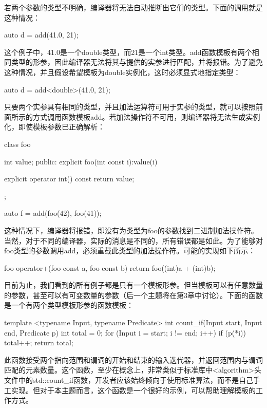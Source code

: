若两个参数的类型不明确，编译器将无法自动推断出它们的类型。下面的调用就是这种情况：

\begin{cpp}
auto d = add(41.0, 21);
\end{cpp}

这个例子中，41.0是一个double类型，而21是一个int类型。add函数模板有两个相同类型的形参，因此编译器无法将其与提供的实参进行匹配，并将报错。为了避免这种情况，并且假设希望模板为double实例化，这时必须显式地指定类型：

\begin{cpp}
auto d = add<double>(41.0, 21);
\end{cpp}

只要两个实参具有相同的类型，并且加法运算符可用于实参的类型，就可以按照前面所示的方式调用函数模板add。若加法操作符不可用，则编译器将无法生成实例化，即使模板参数已正确解析：

\begin{cpp}
class foo
{
	int value;
public:
	explicit foo(int const i):value(i)
	{ }
	
	explicit operator int() const { return value; }
};

auto f = add(foo(42), foo(41));
\end{cpp}

这种情况下，编译器将报错，即没有为类型为foo的参数找到二进制加法操作符。当然，对于不同的编译器，实际的消息是不同的，所有错误都是如此。为了能够对foo类型的参数调用add，必须重载此类型的加法操作符。可能的实现如下所示：

\begin{cpp}
foo operator+(foo const a, foo const b)
{
	return foo((int)a + (int)b);
}
\end{cpp}

目前为止，我们看到的所有例子都是只有一个模板形参。但当模板可以有任意数量的参数，甚至可以有可变数量的参数（后一个主题将在第3章中讨论）。下面的函数是一个有两个类型模板形参的函数模板：

\begin{cpp}
template <typename Input, typename Predicate>
int count_if(Input start, Input end, Predicate p)
{
	int total = 0;
	for (Input i = start; i != end; i++)
	{
		if (p(*i))
			total++;
	}
	return total;
}
\end{cpp}

此函数接受两个指向范围和谓词的开始和结束的输入迭代器，并返回范围内与谓词匹配的元素数量。这个函数，至少在概念上，非常类似于标准库中<algorithm>头文件中的std::count\_if函数，开发者应该始终倾向于使用标准算法，而不是自己手工实现。但对于本主题而言，这个函数是一个很好的示例，可以帮助理解模板的工作方式。


